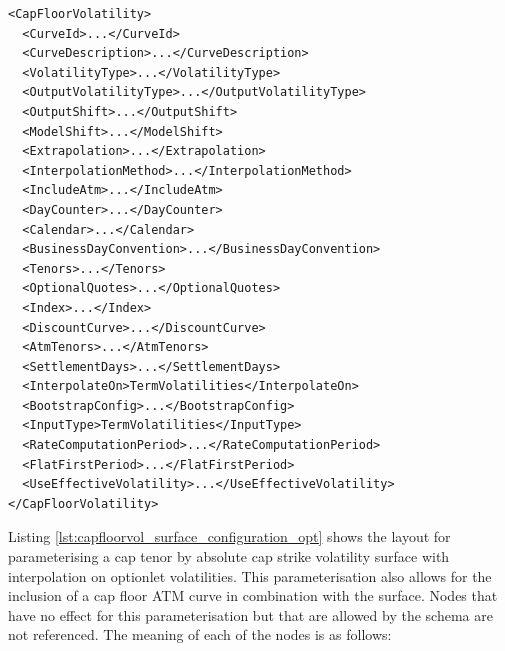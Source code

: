 \begin{longlisting}
\begin{verbatim}
<CapFloorVolatility>
  <CurveId>...</CurveId>
  <CurveDescription>...</CurveDescription>
  <VolatilityType>...</VolatilityType>
  <OutputVolatilityType>...</OutputVolatilityType>
  <OutputShift>...</OutputShift>
  <ModelShift>...</ModelShift>
  <Extrapolation>...</Extrapolation>
  <InterpolationMethod>...</InterpolationMethod>
  <IncludeAtm>...</IncludeAtm>
  <DayCounter>...</DayCounter>
  <Calendar>...</Calendar>
  <BusinessDayConvention>...</BusinessDayConvention>
  <Tenors>...</Tenors>
  <OptionalQuotes>...</OptionalQuotes>
  <Index>...</Index>
  <DiscountCurve>...</DiscountCurve>
  <AtmTenors>...</AtmTenors>
  <SettlementDays>...</SettlementDays>
  <InterpolateOn>TermVolatilities</InterpolateOn>
  <BootstrapConfig>...</BootstrapConfig>
  <InputType>TermVolatilities</InputType>
  <RateComputationPeriod>...</RateComputationPeriod>
  <FlatFirstPeriod>...</FlatFirstPeriod>
  <UseEffectiveVolatility>...</UseEffectiveVolatility>
</CapFloorVolatility>
\end{verbatim}
\caption{Cap floor surface with interpolation on term volatilities.}
\label{lst:capfloorvol_surface_configuration_term}
\end{longlisting}


Listing \ref{lst:capfloorvol_surface_configuration_opt} shows the layout for parameterising a cap tenor by absolute cap strike volatility surface with interpolation on optionlet volatilities. This parameterisation also allows for the inclusion of a cap floor ATM curve in combination with the surface. Nodes that have no effect for this parameterisation but that are allowed by the schema are not referenced. The meaning of each of the nodes is as follows:

